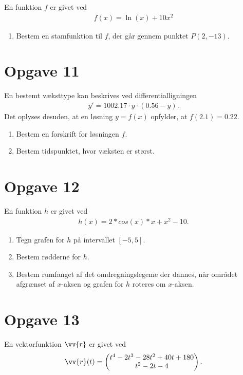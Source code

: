 \documentclass[12pt]{article}
\begin{document}
En funktion $f$ er givet ved
	\begin{align*}
		f(x) = \ln(x)+10x^2
	\end{align*}
	
\begin{enumerate}[label=\roman*)]
	\item Bestem en stamfunktion til $f$, der går gennem punktet $P(2,-13)$. 
\end{enumerate}

\section*{Opgave 11}

En bestemt væksttype kan beskrives ved differentialligningen
\begin{align*}
	y' = 1002.17\cdot y \cdot (0.56-y).
\end{align*}
Det oplyses desuden, at en løsning $y=f(x)$ opfylder, at $f(2.1) = 0.22$.

\begin{enumerate}[label=\roman*)]
	\item Bestem en forskrift for løsningen $f$.
	\item Bestem tidspunktet, hvor væksten er størst. 
\end{enumerate}

\section*{Opgave 12}

En funktion $h$ er givet ved
\begin{align*}
	h(x) = 2*cos(x)*x + x^2 - 10.
\end{align*}
\begin{enumerate}[label=\roman*)]
	\item Tegn grafen for $h$ på intervallet $[-5,5]$. 
	\item Bestem rødderne for $h$. 
	\item Bestem rumfanget af det omdregningslegeme der dannes, når området afgrænset af $x$-aksen og grafen for $h$ roteres om $x$-aksen.
\end{enumerate}

\section*{Opgave 13}

En vektorfunktion $\vv{r}$ er givet ved
\begin{align*}
	\vv{r}(t) = 
	\begin{pmatrix}
		t^4 - 2t^3 - 28t^2 + 40t + 180\\
		t^2 - 2t - 4
	\end{pmatrix}.
\end{align*}
\end{document}
